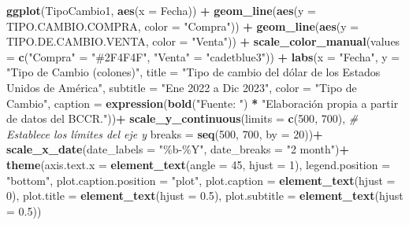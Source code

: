 \documentclass[
]{article}
\newenvironment{Shaded}{\begin{snugshade}}{\end{snugshade}}
\newcommand{\AttributeTok}[1]{\textcolor[rgb]{0.13,0.29,0.53}{#1}}
\newcommand{\CommentTok}[1]{\textcolor[rgb]{0.56,0.35,0.01}{\textit{#1}}}
\newcommand{\DecValTok}[1]{\textcolor[rgb]{0.00,0.00,0.81}{#1}}
\newcommand{\FloatTok}[1]{\textcolor[rgb]{0.00,0.00,0.81}{#1}}
\newcommand{\FunctionTok}[1]{\textcolor[rgb]{0.13,0.29,0.53}{\textbf{#1}}}
\newcommand{\NormalTok}[1]{#1}
\newcommand{\OtherTok}[1]{\textcolor[rgb]{0.56,0.35,0.01}{#1}}
\newcommand{\SpecialCharTok}[1]{\textcolor[rgb]{0.81,0.36,0.00}{\textbf{#1}}}
\newcommand{\StringTok}[1]{\textcolor[rgb]{0.31,0.60,0.02}{#1}}
\begin{document}
\begin{Shaded}
\begin{Highlighting}[]
\FunctionTok{ggplot}\NormalTok{(TipoCambio1, }\FunctionTok{aes}\NormalTok{(}\AttributeTok{x =}\NormalTok{ Fecha)) }\SpecialCharTok{+}
  \FunctionTok{geom\_line}\NormalTok{(}\FunctionTok{aes}\NormalTok{(}\AttributeTok{y =}\NormalTok{ TIPO.CAMBIO.COMPRA, }\AttributeTok{color =} \StringTok{"Compra"}\NormalTok{)) }\SpecialCharTok{+}
  \FunctionTok{geom\_line}\NormalTok{(}\FunctionTok{aes}\NormalTok{(}\AttributeTok{y =}\NormalTok{ TIPO.DE.CAMBIO.VENTA, }\AttributeTok{color =} \StringTok{"Venta"}\NormalTok{)) }\SpecialCharTok{+}
  \FunctionTok{scale\_color\_manual}\NormalTok{(}\AttributeTok{values =} \FunctionTok{c}\NormalTok{(}\StringTok{"Compra"} \OtherTok{=} \StringTok{"\#2F4F4F"}\NormalTok{, }\StringTok{"Venta"} \OtherTok{=} \StringTok{"cadetblue3"}\NormalTok{)) }\SpecialCharTok{+}
  \FunctionTok{labs}\NormalTok{(}\AttributeTok{x =} \StringTok{"Fecha"}\NormalTok{, }
       \AttributeTok{y =} \StringTok{"Tipo de Cambio (colones)"}\NormalTok{,}
       \AttributeTok{title =} \StringTok{"Tipo de cambio del dólar de los Estados Unidos de América"}\NormalTok{, }
       \AttributeTok{subtitle =} \StringTok{"Ene 2022 a Dic 2023"}\NormalTok{,}
       \AttributeTok{color =} \StringTok{"Tipo de Cambio"}\NormalTok{,}
       \AttributeTok{caption =} \FunctionTok{expression}\NormalTok{(}\FunctionTok{bold}\NormalTok{(}\StringTok{"Fuente: "}\NormalTok{) }\SpecialCharTok{*} \StringTok{"Elaboración propia a partir de datos del BCCR."}\NormalTok{))}\SpecialCharTok{+}
  \FunctionTok{scale\_y\_continuous}\NormalTok{(}\AttributeTok{limits =} \FunctionTok{c}\NormalTok{(}\DecValTok{500}\NormalTok{, }\DecValTok{700}\NormalTok{),  }\CommentTok{\# Establece los límites del eje y}
                     \AttributeTok{breaks =} \FunctionTok{seq}\NormalTok{(}\DecValTok{500}\NormalTok{, }\DecValTok{700}\NormalTok{, }\AttributeTok{by =} \DecValTok{20}\NormalTok{))}\SpecialCharTok{+}
   \FunctionTok{scale\_x\_date}\NormalTok{(}\AttributeTok{date\_labels =} \StringTok{"\%b{-}\%Y"}\NormalTok{, }\AttributeTok{date\_breaks =} \StringTok{"2 month"}\NormalTok{)}\SpecialCharTok{+}
  \FunctionTok{theme}\NormalTok{(}\AttributeTok{axis.text.x =} \FunctionTok{element\_text}\NormalTok{(}\AttributeTok{angle =} \DecValTok{45}\NormalTok{, }\AttributeTok{hjust =} \DecValTok{1}\NormalTok{),}
        \AttributeTok{legend.position =} \StringTok{"bottom"}\NormalTok{,}
        \AttributeTok{plot.caption.position =} \StringTok{"plot"}\NormalTok{,}
        \AttributeTok{plot.caption =} \FunctionTok{element\_text}\NormalTok{(}\AttributeTok{hjust =} \DecValTok{0}\NormalTok{),}
        \AttributeTok{plot.title =} \FunctionTok{element\_text}\NormalTok{(}\AttributeTok{hjust =} \FloatTok{0.5}\NormalTok{),}
        \AttributeTok{plot.subtitle =} \FunctionTok{element\_text}\NormalTok{(}\AttributeTok{hjust =} \FloatTok{0.5}\NormalTok{))}
\end{Highlighting}
\end{Shaded}
\end{document}
